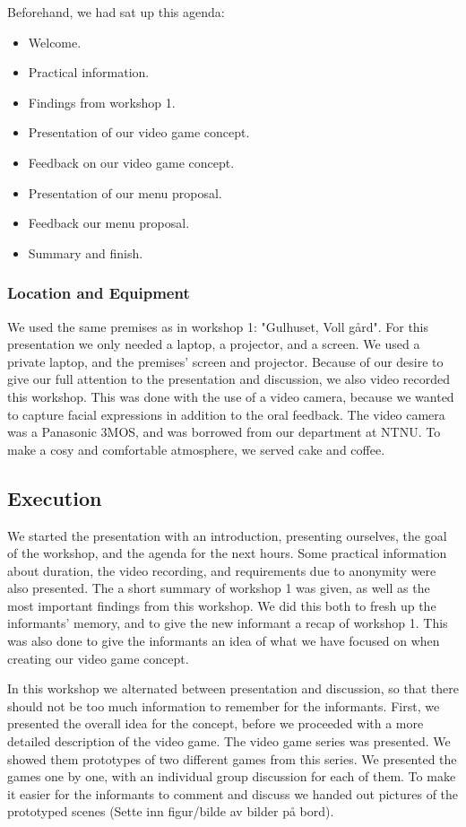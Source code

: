 Beforehand, we had sat up this agenda:

\begin{itemize}
\renewcommand{\labelitemi}{$\bullet$}
\item Welcome.
\item Practical information.
\item Findings from workshop 1.
\item Presentation of our video game concept.
\item Feedback on our video game concept.
\item Presentation of our menu proposal.
\item Feedback our menu proposal.
\item Summary and finish.
\end{itemize}


\subsubsection{Location and Equipment}
We used the same premises as in workshop 1: "Gulhuset, Voll gård". 
For this presentation we only needed a laptop, a projector, and a screen. We used a private laptop, and the premises' screen and projector. Because of our desire to give our full attention to the presentation and discussion, we also video recorded this workshop. This was done with the use of a video camera, because we wanted to capture facial expressions in addition to the oral feedback. The video camera was a Panasonic 3MOS, and was borrowed from our department at NTNU. To make a cosy and comfortable atmosphere, we served cake and coffee.   

\subsection{Execution}
We started the presentation with an introduction, presenting ourselves, the goal of the workshop, and the agenda for the next hours. Some practical information about duration, the video recording, and requirements due to anonymity were also presented. The a short summary of workshop 1 was given, as well as the most important findings from this workshop. We did this both to fresh up the informants' memory, and to give the new informant a recap of workshop 1. This was also done to give the informants an idea of what we have focused on when creating our video game concept.        

In this workshop we alternated between presentation and discussion, so that there should not be too much information to remember for the informants. First, we presented the overall idea for the concept, before we proceeded with a more detailed description of the video game. The video game series was presented. We showed them prototypes of two different games from this series. We presented the games one by one, with an individual group discussion for each of them. To make it easier for the informants to comment and discuss we handed out pictures of the prototyped scenes (Sette inn figur/bilde av bilder på bord). 

